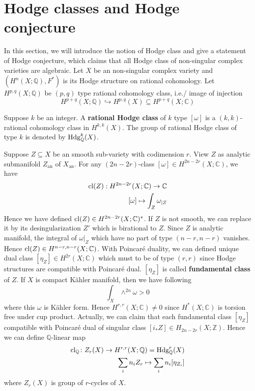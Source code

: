 \documentclass[11pt,oneside,a4paper]{amsbook}
\begin{document}
\section{Hodge classes and Hodge conjecture}
In this section, we will introduce the notion of Hodge class and give a statement of Hodge conjecture, which claims that all Hodge class of non-singular complex varieties are algebraic. Let $X$ be an non-singular complex variety and $(H^n(X;\mathbb{Q}),F^*)$ is its Hodge structure on rational cohomology. Let $H^{p,q}(X;\mathbb{Q})$ be $(p,q)$ type rational cohomology class, i.e./ image of injection
\begin{equation}
	H^{p+q}(X;\mathbb{Q}) \hookrightarrow H^{p,q}(X) \subseteq H^{p+q}(X;\mathbb{C})
\end{equation}
\begin{secdefn}
	Suppose $k$ be an integer. A \textbf{rational Hodge class} of $k$ type $[\omega]$ is a $(k,k)$-rational cohomology class in $H^{k,k}(X)$. The group of rational Hodge class of type $k$ is denoted by $\operatorname{Hdg}_\mathbb{Q}^k(X)$.
\end{secdefn}
Suppose $Z \subseteq X$ be an smooth sub-variety with codimension $r$. View $Z$ as analytic submanifold $Z_\text{an}$ of $X_\text{an}$. For any $(2n-2r)$-class $[\omega] \in H^{2n-2r}(X;\mathbb{C})$, we have
\begin{align*}
\operatorname{cl}(Z):H^{2n-2r}(X;\mathbb{C}) \rightarrow \mathbb{C}\\
[\omega] \mapsto \int_{Z} \omega_{|Z}
\end{align*}
Hence we have defined $\operatorname{cl}(Z) \in H^{2n-2r}(X;\mathbb{C})^*$. If $Z$ is not smooth, we can replace it by its desingularization $Z'$ which is birational to $Z$. Since $Z$ is analytic manifold, the integral of $\omega|_Z$ which have no part of type $(n-r,n-r)$ vanishes. Hence $\operatorname{cl}(Z) \in H^{n-r,n-r}(X; \mathbb{C})$.
With Poincar\'e duality, we can defined unique dual class $[\eta_Z] \in H^{2r}(X;\mathbb{C})$ which must to be of type $(r,r)$ since Hodge structures are compatible with Poincar\'e dual. $[\eta_Z]$ is called \textbf{fundamental class} of $Z$.
If $X$ is compact K\"ahler manifold, then we have following 
\begin{equation}
	\int_{X} \wedge^{2n}\omega >0 
\end{equation}
where this $\omega$ is K\"ahler form. Hence $H^{r,r}(X;\mathbb{C}) \neq 0$ since $H^*(X;\mathbb{C})$ is torsion free under cup product.
Actually, we can claim that each fundamental class $[\eta_Z]$ compatible with Poincar\'e dual of singular class $[i_*Z] \in H_{2n-2r}(X;\mathbb{Z})$. Hence we can define $\mathbb{Q}$-linear map
\begin{align*}
	\operatorname{cl_\mathbb{Q}} \colon Z_r(X) \to H^{r,r}(X;\mathbb{Q})=\operatorname{Hdg}_\mathbb{Q}^r(X)\\
	\sum_i n_i Z_r \mapsto \sum_i n_i [\eta_{Z_i}]	
\end{align*}
where $Z_r(X)$ is group of $r$-cycles of $X$.
\end{document}
